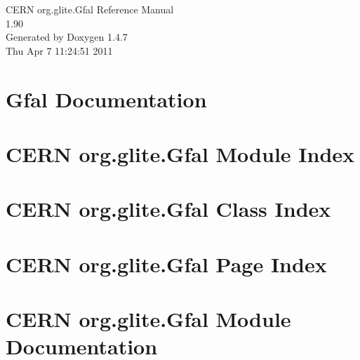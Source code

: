\documentclass[a4paper]{book}
\begin{document}
\begin{titlepage}
\vspace*{7cm}
\begin{center}
{\Large CERN org.glite.Gfal Reference Manual\\[1ex]\large 1.90 }\\
\vspace*{1cm}
{\large Generated by Doxygen 1.4.7}\\
\vspace*{0.5cm}
{\small Thu Apr 7 11:24:51 2011}\\
\end{center}
\end{titlepage}
\clearemptydoublepage
{}
\tableofcontents
\clearemptydoublepage
{}
\chapter{Gfal Documentation }
\label{index}
\chapter{CERN org.glite.Gfal Module Index}

\chapter{CERN org.glite.Gfal Class Index}

\chapter{CERN org.glite.Gfal Page Index}

\chapter{CERN org.glite.Gfal Module Documentation}





\end{document}
